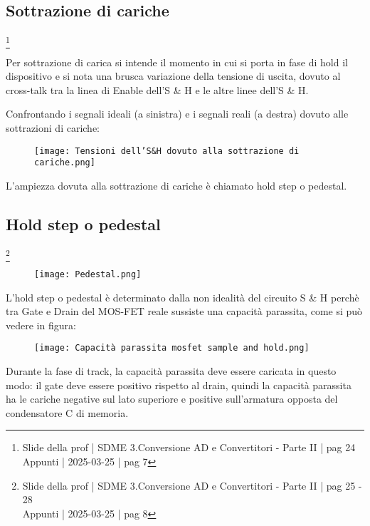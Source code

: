 \newpage 

\subsection{Sottrazione di cariche} 
\footnote{Slide della prof | SDME 3.Conversione AD e Convertitori - Parte II | pag 24 \\  
Appunti | 2025-03-25 | pag 7} 

Per sottrazione di carica si intende il momento in cui si porta in fase di hold il dispositivo 
e si nota una brusca variazione della tensione di uscita, 
dovuto al cross-talk tra la linea di Enable dell'S \& H e le altre linee dell'S \& H. \newline 

Confrontando i segnali ideali (a sinistra) e i segnali reali (a destra) dovuto alle sottrazioni di cariche: 

\begin{figure}[h]
    \centering
    \texttt{[image: Tensioni dell'S\&H dovuto alla sottrazione di cariche.png]}
\end{figure}


L'ampiezza dovuta alla sottrazione di cariche è chiamato hold step o pedestal. \newline

\newpage 

\subsection{Hold step o pedestal} 
\footnote{Slide della prof | SDME 3.Conversione AD e Convertitori - Parte II | pag 25 - 28 \\  
Appunti | 2025-03-25 | pag 8} 

\begin{figure}[h]
    \centering
    \texttt{[image: Pedestal.png]}
\end{figure}

L'hold step o pedestal è determinato dalla non idealità del circuito S \& H perchè tra Gate e Drain del MOS-FET reale sussiste una capacità parassita, 
come si può vedere in figura: 

\begin{figure}[h]
    \centering
    \texttt{[image: Capacità parassita mosfet sample and hold.png]}
\end{figure}

Durante la fase di track, la capacità parassita deve essere caricata in questo modo: 
il gate deve essere positivo rispetto al drain, quindi la capacità parassita ha le cariche negative sul lato superiore 
e positive sull'armatura opposta del condensatore C di memoria. \newline 

